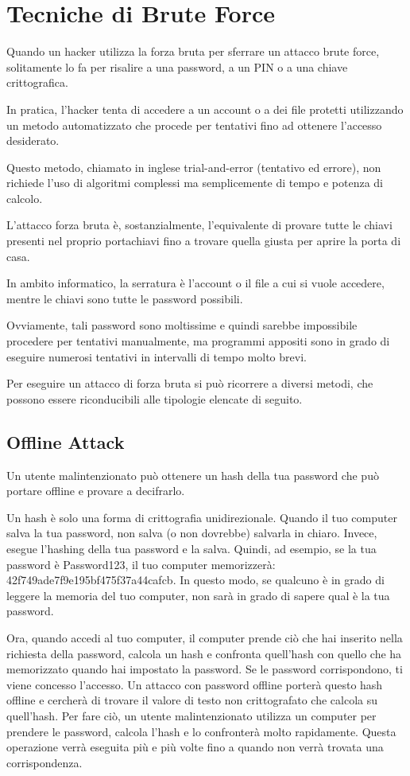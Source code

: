 \chapter{Tecniche di Brute Force}
Quando un hacker utilizza la forza bruta per sferrare un attacco brute force, solitamente lo fa per risalire a una password, a un PIN o a una chiave crittografica.

In pratica, l'hacker tenta di accedere a un account o a dei file protetti utilizzando un metodo automatizzato che procede per tentativi fino ad ottenere l'accesso desiderato.

Questo metodo, chiamato in inglese trial-and-error (tentativo ed errore), non richiede l'uso di algoritmi complessi ma semplicemente di tempo e potenza di calcolo.

L'attacco forza bruta è, sostanzialmente, l'equivalente di provare tutte le chiavi presenti nel proprio portachiavi fino a trovare quella giusta per aprire la porta di casa.

In ambito informatico, la serratura è l'account o il file a cui si vuole accedere, mentre le chiavi sono tutte le password possibili.

Ovviamente, tali password sono moltissime e quindi sarebbe impossibile procedere per tentativi manualmente, ma programmi appositi sono in grado di eseguire numerosi tentativi in intervalli di tempo molto brevi.

Per eseguire un attacco di forza bruta si può ricorrere a diversi metodi, che possono essere riconducibili alle tipologie elencate di seguito.
\section{Offline Attack}

Un utente malintenzionato può ottenere un hash della tua password che può portare offline \cite{Offline_attack} e provare a decifrarlo.

Un hash è solo una forma di crittografia unidirezionale. Quando il tuo computer salva la tua password, non salva (o non dovrebbe) salvarla in chiaro. Invece, esegue l'hashing della tua password e la salva. Quindi, ad esempio, se la tua password è Password123, il tuo computer memorizzerà: 42f749ade7f9e195bf475f37a44cafcb. In questo modo, se qualcuno è in grado di leggere la memoria del tuo computer, non sarà in grado di sapere qual è la tua password.

Ora, quando accedi al tuo computer, il computer prende ciò che hai inserito nella richiesta della password, calcola un hash e confronta quell'hash con quello che ha memorizzato quando hai impostato la password. Se le password corrispondono, ti viene concesso l'accesso. Un attacco con password offline porterà questo hash offline e cercherà di trovare il valore di testo non crittografato che calcola su quell'hash. Per fare ciò, un utente malintenzionato utilizza un computer per prendere le password, calcola l'hash e lo confronterà molto rapidamente. Questa operazione verrà eseguita più e più volte fino a quando non verrà trovata una corrispondenza.

